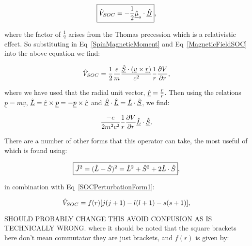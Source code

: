 \begin{equation}
    \boxed{\Hat{V}_{SOC} = - \frac{1}{2} \underline{\Hat{\mu}}_s \cdot \underline{\Hat{B}}},
    \label{SOCPerturbation}
\end{equation}

\noindent where the factor of $\frac{1}{2}$ arises from the Thomas precession which is a relativistic effect. So substituting in Eq~\ref{SpinMagneticMoment} and Eq~\ref{MagneticFieldSOC} into the above equation we find:

\begin{equation}
    \Hat{V}_{SOC} = \frac{1}{2} \frac{e}{m} \frac{\underline{\Hat{S}} \cdot (\underline{v} \times \underline{r})}{c^2} \frac{1}{r} \frac{\partial V}{\partial r},
\end{equation}

\noindent where we have used that the radial unit vector, $\underline{\Hat{r}} = \frac{\underline{r}}{r}$. Then using the relations $\underline{p} = m \underline{v}$, $\underline{\Hat{L}} = \underline{\Hat{r}} \times \underline{p} = - \underline{p} \times \underline{\Hat{r}}$ and $\underline{\Hat{S}} \cdot \underline{\Hat{L}} = \underline{\Hat{L}} \cdot \underline{\Hat{S}}$, we find:

\begin{equation}
    \frac{-e}{2m^2c^2} \frac{1}{r} \frac{\partial V}{\partial r} \underline{\Hat{L}} \cdot \underline{\Hat{S}}.
    \label{SOCPerturbationForm1}
\end{equation}

\noindent There are a number of other forms that this operator can take, the most useful of which is found using:

\begin{equation}
    \boxed{\Hat{J}^2 = (\Hat{L} + \Hat{S})^2 = \Hat{L}^2 + \Hat{S}^2 + 2 \Hat{L} \cdot \Hat{S}},
    \label{TotalAngularMomentumExpansion}
\end{equation}

\noindent in combination with Eq~\ref{SOCPerturbationForm1}:

\begin{equation}
    \Hat{V}_{SOC} = f(r)[j(j + 1) - l(l + 1) - s(s + 1)],
    \label{SOCPerturbationForm2}
\end{equation}

\noindent SHOULD PROBABLY CHANGE THIS AVOID CONFUSION AS IS TECHNICALLY WRONG. where it should be noted that the square brackets here don't mean commutator they are just brackets, and $f(r)$ is given by:

